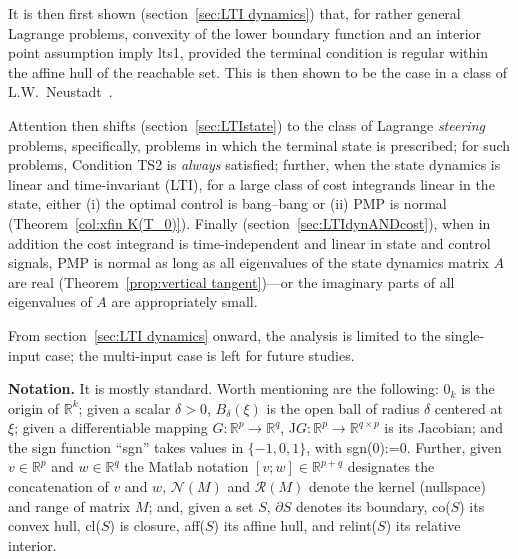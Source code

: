 \documentclass[letterpaper,10pt,conference]{ieeeconf}
\def\R{{\mathbb{R}}}
\begin{document}
It is then first shown (section~\ref{sec:LTI dynamics}) that, 
for rather general Lagrange problems, 
convexity of the lower boundary function
and an interior point assumption 
imply lts1, provided the terminal
condition is regular within the affine hull of the reachable set.
This is then shown 
to be the case in a class of 
L.W.~Neustadt~\cite[Theorem 1]{Neustadt1963}.  

Attention then shifts (section~\ref{sec:LTIstate}) to the class of 
Lagrange {\em steering} problems, specifically,
problems in which the terminal state is prescribed; for such problems,
Condition TS2 is {\em always} satisfied; further, when the state
dynamics is linear and time-invariant (LTI), for a large class of
cost integrands linear in the state, either (i) the optimal control is
bang--bang or (ii) PMP is normal (Theorem~\ref{col:xfin K(T_0)}).
Finally (section~\ref{sec:LTIdynANDcost}), when in addition the cost 
integrand is time-independent and linear 
in state and control signals, PMP is normal as long as all eigenvalues 
of the state dynamics
matrix $A$ are real (Theorem~\ref{prop:vertical tangent})---or the
imaginary parts of all eigenvalues of $A$ are appropriately small.

From section~\ref{sec:LTI dynamics} onward, the analysis is limited to
the single-input case; the multi-input case is left for future studies.

\smallskip
{\bf Notation.}  It is mostly standard.  Worth mentioning are the following:
$0_k$ is the origin of $\R^k$; given a scalar $\delta>0$,
$B_\delta(\xi)$ is the open ball of radius $\delta$ centered at $\xi$;
given a differentiable mapping $G:\R^p\to\R^q$, J$G:\R^p\to\R^{q\times p}$
is its Jacobian; and the sign function ``sgn'' takes values 
in $\{-1,0,1\}$, with sgn(0):=0. Further, given $v\in\R^p$ and $w\in\R^q$ the
Matlab notation $[v;w]\in\R^{p+q}$ designates the concatenation of $v$ and $w$,
${\mathcal N}(M)$ and ${\mathcal R}(M)$ denote the kernel (nullspace)
and range of matrix $M$; and,
given a set $S$, $\partial S$ denotes its boundary, co($S$) its convex hull,
cl($S$) is closure, aff($S$) its affine hull, and relint($S$) its relative 
interior.
\end{document}
